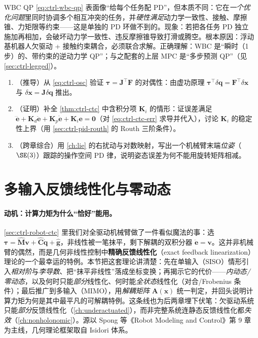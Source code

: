 \begin{pitfall}
WBC QP \cref{eq:ctrl-wbc-qp} 表面像“给每个任务配 PD”，但本质不同：它在\emph{一个优化问题}里同时协调多个相互冲突的任务，并\emph{硬性满足}动力学一致性、接触、摩擦锥、力矩限等约束——这是单独的 PD 环做不到的。现象：若把各任务 PD 独立施加再相加，会破坏动力学一致性、违反摩擦锥导致打滑或腾空。根本原因：浮动基机器人欠驱动 + 接触约束耦合，必须联合求解。正确理解：WBC 是“瞬时（1 步）的、带约束的逆动力学 QP”；与之配套的上层 MPC 是“多步预测 QP”（见 \cref{sec:ctrl-legged}）。
\end{pitfall}

\begin{practice}
\begin{enumerate}
  \item （推导）从 \cref{eq:ctrl-osc} 验证 $\boldsymbol{\tau}=\mathbf{J}^\top\mathbf{F}$ 的对偶性：由虚功原理 $\boldsymbol{\tau}^\top\delta\mathbf{q}=\mathbf{F}^\top\delta\mathbf{x}$ 与 $\delta\mathbf{x}=\mathbf{J}\delta\mathbf{q}$ 推出。
  \item （证明）补全 \cref{thm:ctrl-ctc} 中含积分项 $\mathbf{K}_i$ 的情形：证误差满足 $\dddot{\mathbf{e}}+\mathbf{K}_d\ddot{\mathbf{e}}+\mathbf{K}_p\dot{\mathbf{e}}+\mathbf{K}_i\mathbf{e}=\mathbf{0}$（对 \cref{eq:ctrl-ctc-err} 求导并代入），讨论 $\mathbf{K}_i$ 的稳定性上界（用 \cref{sec:ctrl-pid-routh} 的 Routh 三阶条件）。
  \item （跨章综合）用 \cref{ch:lie} 的右扰动与对数映射，写出一个机械臂末端\emph{位姿}（$\SE(3)$）跟踪的操作空间 PD 律，说明姿态误差为何不能用旋转矩阵相减。
\end{enumerate}
\end{practice}

\section{多输入反馈线性化与零动态}
\label{sec:ctrl-mimo-fbl}

\paragraph{动机：计算力矩为什么“恰好”能用。}
\cref{sec:ctrl-robot-ctc} 里我们对全驱动机械臂做了一件看似魔法的事：选 $\boldsymbol{\tau}=\hat{\mathbf{M}}\mathbf{v}+\hat{\mathbf{C}}\dot{\mathbf{q}}+\hat{\mathbf{g}}$，非线性被一笔抹平，剩下解耦的双积分器 $\ddot{\mathbf{e}}=\mathbf{v}$。这并非机械臂的偶然，而是几何非线性控制中\textbf{精确反馈线性化}（exact feedback linearization）理论的一个最幸运的特例。本节把这套理论讲清楚：先在单输入（SISO）情形引入\emph{相对阶}与\emph{李导数}、把“抹平非线性”落成坐标变换；再揭示它的代价——\emph{内动态/零动态}，以及何时只能\emph{部分}线性化、何时能\emph{全状态}线性化（对合/Frobenius 条件）；最后推广到多输入（MIMO），用\emph{解耦矩阵} $\mathbf{A}(\mathbf{x})$ 统一判定，并回头说明计算力矩为何是其中最平凡的可解耦特例。这条线也为后两章埋下伏笔：欠驱动系统只能\emph{部分}反馈线性化（\cref{ch:underactuated}），而非完整系统连静态反馈线性化都\emph{失效}（\cref{ch:nonholonomic}）。源以 Spong 等《Robot Modeling and Control》第 9 章\cite{spong2006robot}为主线，几何理论框架取自 Isidori 体系\cite{khalil2002nonlinear,slotine1991applied}。

